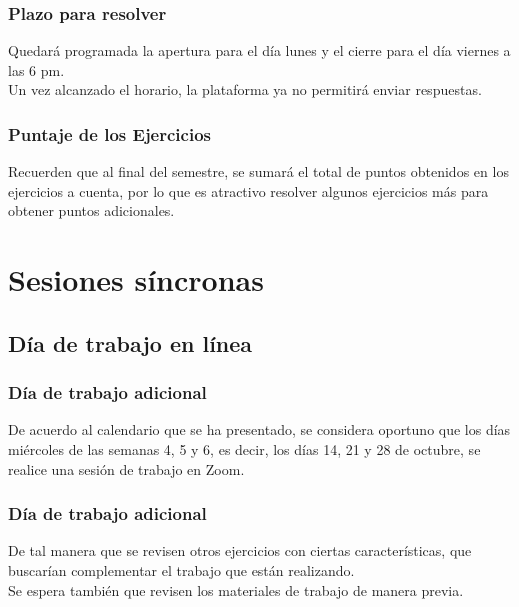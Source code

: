 \begin{frame}
\frametitle{Plazo para resolver}
Quedará programada la apertura para el día lunes y el cierre para el día viernes a las 6 pm.
\\
\bigskip
Un vez alcanzado el horario, la plataforma ya no permitirá enviar respuestas.
\end{frame}
\begin{frame}
\frametitle{Puntaje de los Ejercicios}
Recuerden que al final del semestre, se sumará el total de puntos obtenidos en los ejercicios a cuenta, por lo que es atractivo resolver algunos ejercicios más para obtener puntos adicionales.
\end{frame}
\section{Sesiones síncronas}
\subsection{Día de trabajo en línea}
\begin{frame}
\frametitle{Día de trabajo adicional}
De acuerdo al calendario que se ha presentado, se considera oportuno que los días miércoles de las semanas 4, 5 y 6, es decir, los días 14, 21 y 28 de octubre, se realice una sesión de trabajo en Zoom.
\end{frame}
\begin{frame}
\frametitle{Día de trabajo adicional}
De tal manera que se revisen otros ejercicios con ciertas características, que buscarían complementar el trabajo que están realizando.
\\
\bigskip
Se espera también que revisen los materiales de trabajo de manera previa.
\end{frame}
